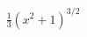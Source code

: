 \documentclass[preview]{standalone}
\begin{document}
\begin{align*}
\frac{1}{3} (x^2 + 1)^{3/2}
\end{align*}
\end{document}
